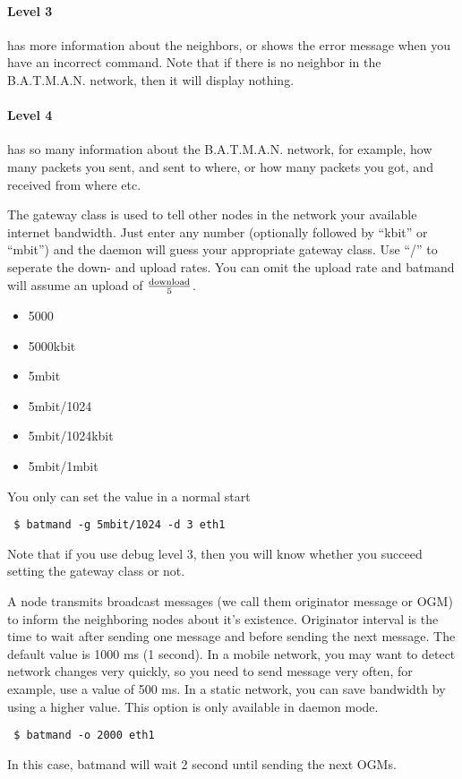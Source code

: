\paragraph*{Level 3}
has more information about the neighbors, or shows the error message when you
have an incorrect command. Note that if there is no neighbor in the B.A.T.M.A.N.
network, then it will display nothing.

\paragraph*{Level 4}
has so many information about the B.A.T.M.A.N. network, for example, how many
packets you sent, and sent to where, or how many packets you got, and received
from where etc.

The gateway class is used to tell other nodes in the network your available
internet bandwidth. Just enter any number (optionally followed by ``kbit'' or
``mbit'') and the daemon will guess your appropriate gateway class. Use ``/'' to
seperate the down- and upload rates. You can omit the upload rate and batmand
will assume an upload of $\mathrm{download}\over{5}$.

\begin{itemize}
\item 5000
\item 5000kbit
\item 5mbit
\item 5mbit/1024
\item 5mbit/1024kbit
\item 5mbit/1mbit
\end{itemize}
You only can set the value in a normal start
\begin{verbatim}
 $ batmand -g 5mbit/1024 -d 3 eth1
\end{verbatim}
Note that if you use debug level 3, then you will know whether you succeed
setting the gateway class or not.

A node transmits broadcast messages (we call them originator message or OGM) to
inform the neighboring nodes about it’s existence. Originator interval is the
time to wait after sending one message and before sending the next message.
The default value is 1000 ms (1 second). In a mobile network, you may want to
detect network changes very quickly, so you need to send message very often, for
example, use a value of 500 ms. In a static network, you can save bandwidth by
using a higher value. This option is only available in daemon mode.
\begin{verbatim}
 $ batmand -o 2000 eth1
\end{verbatim}
In this case, batmand will wait 2 second until sending the next OGMs.

